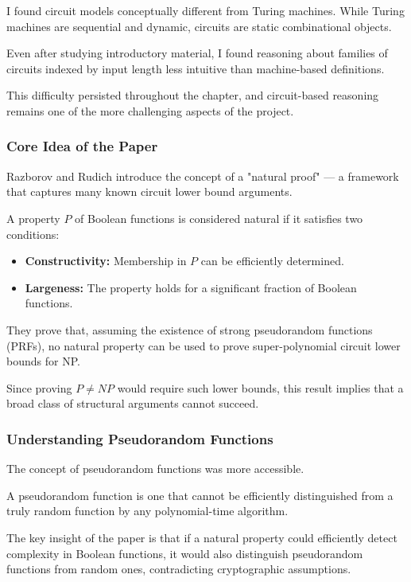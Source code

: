 \documentclass[12pt]{article}
\begin{document}
I found circuit models conceptually different from Turing machines. 
While Turing machines are sequential and dynamic, circuits are static combinational objects.

Even after studying introductory material, I found reasoning about families of circuits indexed by input length less intuitive than machine-based definitions.

This difficulty persisted throughout the chapter, and circuit-based reasoning remains one of the more challenging aspects of the project.

\subsubsection*{Core Idea of the Paper}

Razborov and Rudich introduce the concept of a "natural proof" --- a framework that captures many known circuit lower bound arguments.

A property $P$ of Boolean functions is considered natural if it satisfies two conditions:

\begin{itemize}
\item \textbf{Constructivity:} Membership in $P$ can be efficiently determined.
\item \textbf{Largeness:} The property holds for a significant fraction of Boolean functions.
\end{itemize}

They prove that, assuming the existence of strong pseudorandom functions (PRFs), no natural property can be used to prove super-polynomial circuit lower bounds for NP.

Since proving $P \neq NP$ would require such lower bounds, this result implies that a broad class of structural arguments cannot succeed.

\subsubsection*{Understanding Pseudorandom Functions}

The concept of pseudorandom functions was more accessible.

A pseudorandom function is one that cannot be efficiently distinguished from a truly random function by any polynomial-time algorithm.

The key insight of the paper is that if a natural property could efficiently detect complexity in Boolean functions, it would also distinguish pseudorandom functions from random ones, contradicting cryptographic assumptions.
\end{document}

